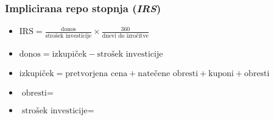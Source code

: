 \documentclass[14pt]{beamer}
\begin{document}
\begin{frame}
    \frametitle{Implicirana repo stopnja (\textit{IRS})}
    
    \begin{itemize}
        \item $ \text{IRS} = \frac{\text{donos}}{\text{strošek investicije}} 
                \times \frac{360}{\text{dnevi do izročitve}} $
        \item $ \text{donos} = \text{izkupiček} - \text{strošek investicije} $
        \item $ \text{izkupiček} = \text{pretvorjena cena} + \text{natečene obresti} 
                + \text{kuponi} + \text{obresti} $
        \item $ \text{obresti} =  $
        \item $ \text{strošek investicije} =  $
    \end{itemize}


\end{frame}
\end{document}
